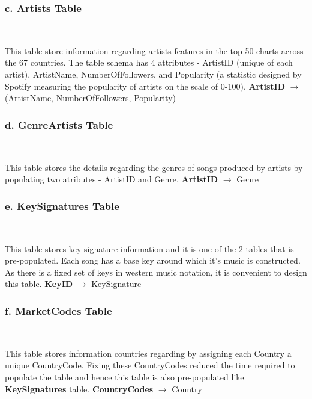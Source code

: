 \documentclass[conference]{IEEEtran}
\begin{document}
\subsubsection*{c. \textbf{Artists} Table} \

This table store information regarding artists features in the top 50 charts across the 67 countries. The table schema has 4 attributes - ArtistID (unique of each artist), ArtistName, NumberOfFollowers, and Popularity (a statistic designed by Spotify measuring the popularity of artists on the scale of 0-100). \linebreak \linebreak
\textbf{ArtistID} $\to$ (ArtistName, NumberOfFollowers, Popularity) \linebreak

\subsubsection*{d. \textbf{GenreArtists} Table} \

This table stores the details regarding the genres of songs produced by artists by populating two atributes - ArtistID and Genre. \linebreak \linebreak
\textbf{ArtistID} $\to$ Genre \linebreak


\subsubsection*{e. \textbf{KeySignatures} Table} \

This table stores key signature information and it is one of the 2 tables that is pre-populated. Each song has a base key around which it's music is constructed. As there is a fixed set of keys in western music notation, it is convenient to design this table. \linebreak \linebreak
\textbf{KeyID} $\to$ KeySignature \linebreak


\subsubsection*{f. \textbf{MarketCodes} Table} \

This table stores information countries regarding by assigning each Country a unique CountryCode. Fixing these CountryCodes reduced the time required to populate the table and hence this table is also pre-populated like \textbf{KeySignatures} table. \linebreak \linebreak  
\textbf{CountryCodes} $\to$ Country \linebreak
\end{document}
